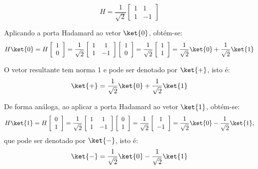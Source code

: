 $$
    \label{eq:hadamard}
    H=\dfrac{1}{\sqrt{2}}\left[\begin{array}{cc}
            1 & 1 \\
            1 & -1
    \end{array}\right]
$$

Aplicando a porta Hadamard ao vetor $\ket{0}$, obtém-se:
$$
    \label{eq:aplicacao_hadamard_0}
    H\ket{0}=H\left[\begin{array}{c}
            1 \\
            0
    \end{array}\right] = \dfrac{1}{\sqrt{2}}\left[\begin{array}{cc}
            1 & 1 \\
            1 & -1
    \end{array}\right]\left[\begin{array}{c}
            1 \\
            0
    \end{array}\right]=\dfrac{1}{\sqrt{2}}\left[\begin{array}{c}
            1 \\
            1
    \end{array}\right]=\dfrac{1}{\sqrt{2}}\ket{0}+\dfrac{1}{\sqrt{2}}\ket{1}
$$

O vetor resultante tem norma 1 e pode ser denotado por $\ket{+}$, isto é:
    $$
        \label{eq:ket_mais}
        \ket{+}=\dfrac{1}{\sqrt{2}}\ket{0}+\dfrac{1}{\sqrt{2}}\ket{1}
    $$

De forma análoga, ao aplicar a porta Hadamard ao vetor $\ket{1}$, obtém-se:
    $$
        \label{eq:aplicacao_hadamard_1}
        H\ket{1}=H\left[\begin{array}{c}
             0\\
             1
        \end{array}\right] = \dfrac{1}{\sqrt{2}}\left[\begin{array}{cc}
             1 & 1 \\
             1 & -1
        \end{array}\right]\left[\begin{array}{c}
             0\\
             1
        \end{array}\right]=\dfrac{1}{\sqrt{2}}\left[\begin{array}{c}
             1 \\
             -1
        \end{array}\right]=\dfrac{1}{\sqrt{2}}\ket{0}-\dfrac{1}{\sqrt{2}}\ket{1},
    $$
que pode ser denotado por $\ket{-}$, isto é:
    $$
        \ket{-}=\dfrac{1}{\sqrt{2}}\ket{0}-\dfrac{1}{\sqrt{2}}\ket{1}
    $$

